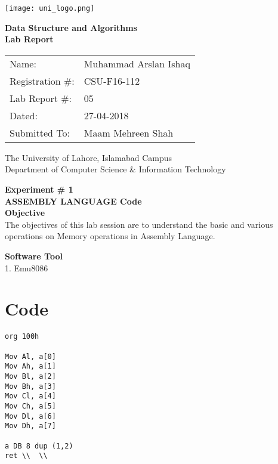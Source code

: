 \documentclass[11pt]{article}            %
\begin{document}
\begin{titlepage}
    \centering
  \vfill
    \texttt{[image: uni\_logo.png]} \\ 
	\vskip2cm
    {\bfseries\Large
	Data Structure and Algorithms \\ 
	
	\vskip2cm
	Lab Report 
	 
	\vskip2cm
	}    

\begin{center}
\begin{tabular}{ l l  } 

Name: & Muhammad Arslan Ishaq \\ 
Registration \#: & CSU-F16-112 \\ 
Lab Report \#: & 05 \\ 
 Dated:& 27-04-2018\\ 
Submitted To:& Maam Mehreen Shah\\ 

\end{tabular}
\end{center}
    \vfill
    The University of Lahore, Islamabad Campus\\
Department of Computer Science \& Information Technology
\end{titlepage}


    
    {\bfseries\Large
\centering
	Experiment \# 1 \\

ASSEMBLY LANGUAGE Code  \\
	
	}    
 \vskip1cm
 \textbf {Objective}\\  The objectives of this lab session are to understand the basic and various operations on Memory operations in Assembly Language. 
 
 \textbf {Software Tool} \\
1.   Emu8086\ 


\section{Code }              
\begin{lstlisting}
org 100h

Mov Al, a[0]
Mov Ah, a[1]
Mov Bl, a[2]
Mov Bh, a[3]
Mov Cl, a[4]
Mov Ch, a[5]
Mov Dl, a[6]
Mov Dh, a[7]

a DB 8 dup (1,2) 
ret \\  \\
\end{lstlisting}
\end{document}
